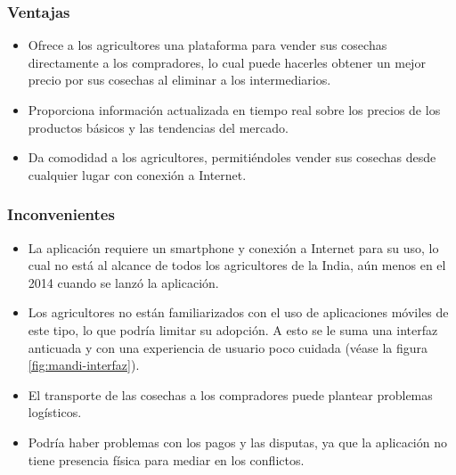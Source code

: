 \subsubsection{Ventajas}

\begin{itemize}

	\item Ofrece a los agricultores una plataforma para vender sus cosechas directamente a los compradores, lo cual puede hacerles obtener un mejor precio por sus cosechas al eliminar a los intermediarios.

	\item Proporciona información actualizada en tiempo real sobre los precios de los productos básicos y las tendencias del mercado.

	\item  Da comodidad a los agricultores, permitiéndoles vender sus cosechas desde cualquier lugar con conexión a Internet.

\end{itemize}

\subsubsection{Inconvenientes}

\begin{itemize}

	\item La aplicación requiere un smartphone y conexión a Internet para su uso, lo cual no está al alcance de todos los agricultores de la India, aún menos en el 2014 cuando se lanzó la aplicación.

	\item Los agricultores no están familiarizados con el uso de aplicaciones móviles de este tipo, lo que podría limitar su adopción. A esto se le suma una interfaz anticuada y con una experiencia de usuario poco cuidada (véase la figura \ref{fig:mandi-interfaz}).

	\item El transporte de las cosechas a los compradores puede plantear problemas logísticos.

	\item Podría haber problemas con los pagos y las disputas, ya que la aplicación no tiene presencia física para mediar en los conflictos.

\end{itemize}


